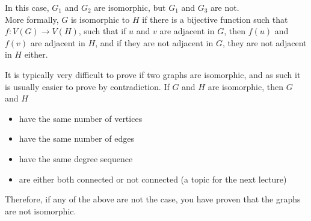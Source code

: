 In this case, $G_1$ and $G_2$ are isomorphic, but $G_1$ and $G_3$ are not.\\

More formally, $G$ is isomorphic to $H$ if there is a bijective function such that $f: V(G) \rightarrow V(H)$, such that
 if $u$ and $v$ are adjacent in $G$, then $f(u)$ and $f(v)$ are adjacent in $H$, and if they are not adjacent in $G$,
 they are not adjacent in $H$ either.

It is typically very difficult to prove if two graphs are isomorphic, and as such it is usually easier to prove by
 contradiction. If $G$ and $H$ are isomorphic, then $G$ and $H$
\begin{itemize}
  \item have the same number of vertices
  \item have the same number of edges
  \item have the same degree sequence
  \item are either both connected or not connected (a topic for the next lecture)
\end{itemize}
Therefore, if any of the above are not the case, you have proven that the graphs are not isomorphic.